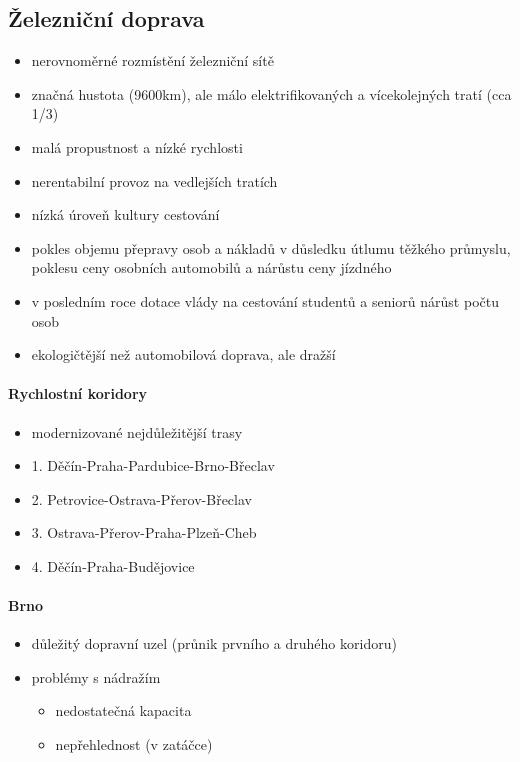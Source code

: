 \subsection{Železniční doprava}
\begin{itemize}
\item nerovnoměrné rozmístění železniční sítě
\item značná hustota (9600km), ale málo elektrifikovaných a vícekolejných tratí (cca 1/3)
\item malá propustnost a nízké rychlosti
\item nerentabilní provoz na vedlejších tratích
\item nízká úroveň kultury cestování
\item pokles objemu přepravy osob a nákladů v důsledku útlumu těžkého průmyslu, poklesu ceny osobních automobilů a nárůstu ceny jízdného
\item v posledním roce dotace vlády na cestování studentů a seniorů \ra nárůst počtu osob
\item ekologičtější než automobilová doprava, ale dražší
\end{itemize}

\paragraph{Rychlostní koridory}
\begin{itemize}
\item modernizované nejdůležitější trasy
\item 1. Děčín-Praha-Pardubice-Brno-Břeclav
\item 2. Petrovice-Ostrava-Přerov-Břeclav
\item 3. Ostrava-Přerov-Praha-Plzeň-Cheb
\item 4. Děčín-Praha-Budějovice
\end{itemize}

\paragraph{Brno}
\begin{itemize}
\item důležitý dopravní uzel (průnik prvního a druhého koridoru)
\item problémy s nádražím
	\begin{itemize}
	\item nedostatečná kapacita
	\item nepřehlednost (v zatáčce)
	\end{itemize}
\end{itemize}

